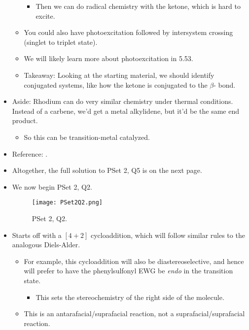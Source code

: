 \documentclass[../notes.tex]{subfiles}
\begin{document}
\begin{itemize}
\begin{itemize}
\begin{itemize}
\begin{itemize}
            \end{itemize}
            \item Then we can do radical chemistry with the ketone, which is hard to excite.
        \end{itemize}
        \item You could also have photoexcitation followed by intersystem crossing (singlet to triplet state).
        \item We will likely learn more about photoexcitation in 5.53.
        \item Takeaway: Looking at the starting material, we should identify conjugated systems, like how the ketone is conjugated to the $\beta$- bond.
    \end{itemize}
    \item Aside: Rhodium can do very similar chemistry under thermal conditions. Instead of a carbene, we'd get a metal alkylidene, but it'd be the same end product.
    \begin{itemize}
        \item So this can be transition-metal catalyzed.
    \end{itemize}
    \item Reference: \textcite{bib:PSet2Q5}.
    \item Altogether, the full solution to PSet 2, Q5 is on the next page.
    
    \item We now begin PSet 2, Q2.
    \begin{figure}[h!]
        \centering
        \texttt{[image: PSet2Q2.png]}
        \caption{PSet 2, Q2.}
        \label{fig:PSet2Q2}
    \end{figure}
    \item Starts off with a $[4+2]$ cycloaddition, which will follow similar rules to the analogous Diels-Alder.
    \begin{itemize}
        \item For example, this cycloaddition will also be diastereoselective, and hence will prefer to have the phenylsulfonyl EWG be \emph{endo} in the transition state.
        \begin{itemize}
            \item This sets the stereochemistry of the right side of the molecule.
        \end{itemize}
        \item This is an antarafacial/suprafacial reaction, not a suprafacial/suprafacial reaction.
        \begin{itemize}

\end{itemize}
\end{itemize}
\end{itemize}
\end{document}
